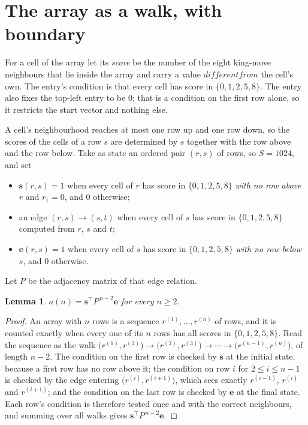 \documentclass[11pt,a4paper]{article}
\theoremstyle{plain}
\newtheorem{lemma}[theorem]{Lemma}
\theoremstyle{definition}
\begin{document}
\section{The array as a walk, with boundary}

For a cell of the array let its \emph{score} be the number of the eight king-move neighbours that lie inside
the array and carry a value $different from$ the cell's own. The entry's condition is that every cell
has score in $\{0,1,2,5,8\}$. The entry also fixes the top-left entry to be $0$; that is a condition on the first row alone, so it restricts the start vector and nothing else.

A cell's neighbourhood reaches at most one row up and one row down, so the scores of the
cells of a row $s$ are determined by $s$ together with the row above and the row below.
Take as state an ordered pair $(r,s)$ of rows, so $S=1024$, and set
\begin{itemize}
\item $\mathbf{s}(r,s)=1$ when every cell of $r$ has score in $\{0,1,2,5,8\}$ \emph{with no row
above $r$} and $r_1=0$, and $0$ otherwise;
\item an edge $(r,s)\to(s,t)$ when every cell of $s$ has score in $\{0,1,2,5,8\}$ computed from
$r$, $s$ and $t$;
\item $\mathbf{e}(r,s)=1$ when every cell of $s$ has score in $\{0,1,2,5,8\}$ \emph{with no row
below $s$}, and $0$ otherwise.
\end{itemize}
Let $P$ be the adjacency matrix of that edge relation.

\begin{lemma}\label{lem:walk}
$a(n)=\mathbf{s}^{\!\top}P^{\,n-2}\mathbf{e}$ for every $n\ge2$.
\end{lemma}

\begin{proof}
An array with $n$ rows is a sequence $r^{(1)},\dots,r^{(n)}$ of rows, and it is counted
exactly when every one of its $n$ rows has all scores in $\{0,1,2,5,8\}$. Read the sequence as the
walk $\bigl(r^{(1)},r^{(2)}\bigr)\to\bigl(r^{(2)},r^{(3)}\bigr)\to\cdots\to
\bigl(r^{(n-1)},r^{(n)}\bigr)$, of length $n-2$. The condition on the first row is
checked by $\mathbf{s}$ at the initial state, because a first row has no row above it; the
condition on row $i$ for $2\le i\le n-1$ is checked by the edge entering
$\bigl(r^{(i)},r^{(i+1)}\bigr)$, which sees exactly $r^{(i-1)}$, $r^{(i)}$ and
$r^{(i+1)}$; and the condition on the last row is checked by $\mathbf{e}$ at the final
state. Each row's condition is therefore tested once and with the correct neighbours, and
summing over all walks gives $\mathbf{s}^{\!\top}P^{\,n-2}\mathbf{e}$.
\end{proof}
\end{document}

